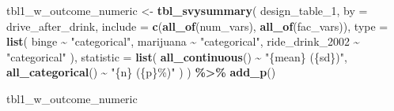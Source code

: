 \documentclass[
]{article}
\newenvironment{Shaded}{\begin{snugshade}}{\end{snugshade}}
\newcommand{\AttributeTok}[1]{\textcolor[rgb]{0.13,0.29,0.53}{#1}}
\newcommand{\FunctionTok}[1]{\textcolor[rgb]{0.13,0.29,0.53}{\textbf{#1}}}
\newcommand{\NormalTok}[1]{#1}
\newcommand{\OtherTok}[1]{\textcolor[rgb]{0.56,0.35,0.01}{#1}}
\newcommand{\SpecialCharTok}[1]{\textcolor[rgb]{0.81,0.36,0.00}{\textbf{#1}}}
\newcommand{\StringTok}[1]{\textcolor[rgb]{0.31,0.60,0.02}{#1}}
\begin{document}
\begin{Shaded}
\begin{Highlighting}[]
\NormalTok{tbl1\_w\_outcome\_numeric }\OtherTok{\textless{}{-}} \FunctionTok{tbl\_svysummary}\NormalTok{(}
\NormalTok{  design\_table\_1,}
  \AttributeTok{by =}\NormalTok{ drive\_after\_drink,}
  \AttributeTok{include =} \FunctionTok{c}\NormalTok{(}\FunctionTok{all\_of}\NormalTok{(num\_vars), }\FunctionTok{all\_of}\NormalTok{(fac\_vars)),}
  \AttributeTok{type =} \FunctionTok{list}\NormalTok{(}
\NormalTok{    binge }\SpecialCharTok{\textasciitilde{}} \StringTok{"categorical"}\NormalTok{,}
\NormalTok{    marijuana }\SpecialCharTok{\textasciitilde{}} \StringTok{"categorical"}\NormalTok{,}
\NormalTok{    ride\_drink\_2002 }\SpecialCharTok{\textasciitilde{}} \StringTok{"categorical"}
\NormalTok{  ),}
  \AttributeTok{statistic =} \FunctionTok{list}\NormalTok{(}
    \FunctionTok{all\_continuous}\NormalTok{() }\SpecialCharTok{\textasciitilde{}} \StringTok{"\{mean\} (\{sd\})"}\NormalTok{,}
    \FunctionTok{all\_categorical}\NormalTok{() }\SpecialCharTok{\textasciitilde{}} \StringTok{"\{n\} (\{p\}\%)"}
\NormalTok{  )}
\NormalTok{) }\SpecialCharTok{\%\textgreater{}\%}
  \FunctionTok{add\_p}\NormalTok{() }

\NormalTok{tbl1\_w\_outcome\_numeric }
\end{Highlighting}
\end{Shaded}
\end{document}
